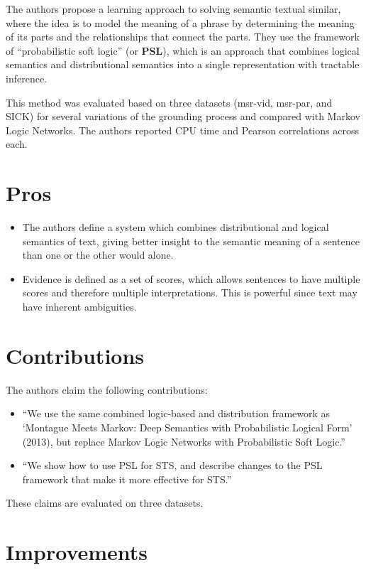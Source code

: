 \documentclass[letterpaper]{article}
\begin{document}
The authors propose a learning approach to solving semantic textual similar, where the idea is to model the meaning of a phrase by determining the meaning of its parts and the relationships that connect the parts. They use the framework of ``probabilistic soft logic'' (or \textbf{PSL}), which is an approach that combines logical semantics and distributional semantics into a single representation with tractable inference.

This method was evaluated based on three datasets (msr-vid, msr-par, and SICK) for several variations of the grounding process and compared with Markov Logic Networks. The authors reported CPU time and Pearson correlations across each.

\section{Pros}

\begin{itemize}
    \item The authors define a system which combines distributional and logical semantics of text, giving better insight to the semantic meaning of a sentence than one or the other would alone.
    \item Evidence is defined as a set of scores, which allows sentences to have multiple scores and therefore multiple interpretations. This is powerful since text may have inherent ambiguities.
\end{itemize}

\section{Contributions}

The authors claim the following contributions:

\begin{itemize}
    \item ``We use the same combined logic-based and distribution framework as `Montague Meets Markov: Deep Semantics with Probabilistic Logical Form' (2013), but replace Markov Logic Networks with Probabilistic Soft Logic.''
    \item ``We show how to use PSL for STS, and describe changes to the PSL framework that make it more effective for STS.''
\end{itemize}

These claims are evaluated on three datasets.

\section{Improvements}
\end{document}
